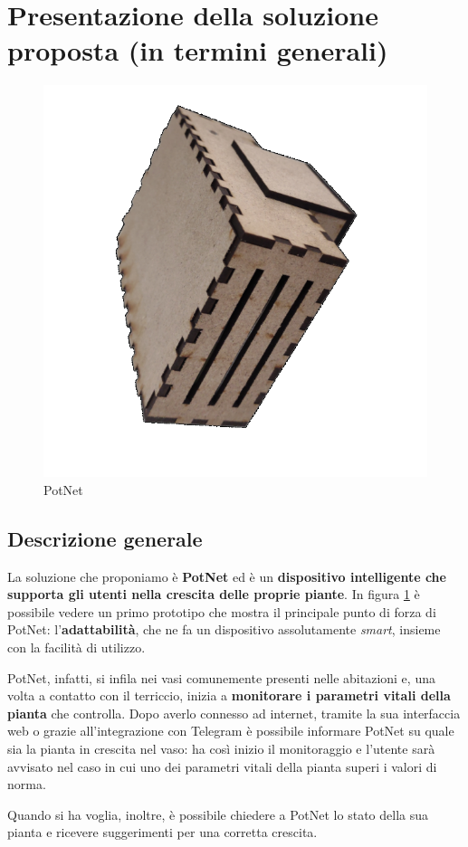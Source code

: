 \section{Presentazione della soluzione proposta (in termini generali)}

\begin{figure}
	\centering
	\vspace{-15mm}
	\includegraphics[width=.4\textwidth]{images/potnet.png}
	\vspace{-7mm}
	\caption{PotNet}
	\vspace{-5mm}
	\label{fig:potnet}
\end{figure}

\subsection{Descrizione generale}

La soluzione che proponiamo è \textbf{PotNet} ed è un \textbf{dispositivo intelligente che supporta gli utenti nella crescita delle proprie piante}. In figura \ref{fig:potnet} è possibile vedere un primo prototipo che mostra il principale punto di forza di PotNet: l'\textbf{adattabilità}, che ne fa un dispositivo assolutamente \textit{smart}, insieme con la facilità di utilizzo.

PotNet, infatti, si infila nei vasi comunemente presenti nelle abitazioni e, una volta a contatto con il terriccio, inizia a \textbf{monitorare i parametri vitali della pianta} che controlla.
Dopo averlo connesso ad internet, tramite la sua interfaccia web o grazie all'integrazione con Telegram è possibile informare PotNet su quale sia la pianta in crescita nel vaso: ha così inizio il monitoraggio e l'utente sarà avvisato nel caso in cui uno dei parametri vitali della pianta superi i valori di norma.

Quando si ha voglia, inoltre, è possibile chiedere a PotNet lo stato della sua pianta e ricevere suggerimenti per una corretta crescita.

